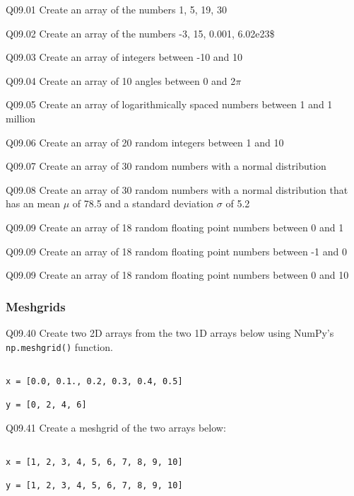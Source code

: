 \documentclass{book}
\newenvironment{problems}{}{}  %
\newcommand{\passthrough}[1]{#1}
\begin{document}
    
        \begin{problems}
        Q09.01 Create an array of the numbers 1, 5, 19, 30

Q09.02 Create an array of the numbers -3, 15, 0.001, 6.02e23\$

Q09.03 Create an array of integers between -10 and 10

Q09.04 Create an array of 10 angles between 0 and 2\(\pi\)

Q09.05 Create an array of logarithmically spaced numbers between 1 and 1
million

Q09.06 Create an array of 20 random integers between 1 and 10

Q09.07 Create an array of 30 random numbers with a normal distribution

Q09.08 Create an array of 30 random numbers with a normal distribution
that has an mean \(\mu\) of 78.5 and a standard deviation \(\sigma\) of
5.2

Q09.09 Create an array of 18 random floating point numbers between 0 and
1

Q09.09 Create an array of 18 random floating point numbers between -1
and 0

Q09.09 Create an array of 18 random floating point numbers between 0 and
10
        \end{problems}

    




    
        \hypertarget{meshgrids}{%
\subsubsection{Meshgrids}\label{meshgrids}}
    




    
        Q09.40 Create two 2D arrays from the two 1D arrays below using NumPy's
\passthrough{\lstinline!np.meshgrid()!} function.

\begin{lstlisting}

x = [0.0, 0.1., 0.2, 0.3, 0.4, 0.5]

y = [0, 2, 4, 6]
\end{lstlisting}

Q09.41 Create a meshgrid of the two arrays below:

\begin{lstlisting}

x = [1, 2, 3, 4, 5, 6, 7, 8, 9, 10]

y = [1, 2, 3, 4, 5, 6, 7, 8, 9, 10]
\end{lstlisting}
\end{document}
